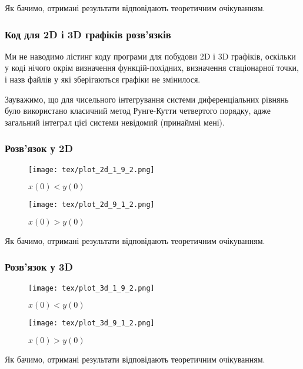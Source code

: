 Як бачимо, отримані результати відповідають теоретичним очікуванням.

\subsubsection{Код для 2D і 3D графіків розв'язків}

Ми не наводимо лістинг коду програми для побудови 2D і 3D графіків, оскільки у коді нічого окрім визначення функцій-похідних, визначення стаціонарної точки, і назв файлів у які зберігаються графіки не змінилося. \medskip

Зауважимо, що для чисельного інтегрування системи диференціальних рівнянь було використано класичний метод Рунге-Кутти четвертого порядку, адже загальний інтеграл цієї системи невідомий (принаймні мені). 

\subsubsection{Розв'язок у 2D}

\begin{figure}[H]
	\centering
	\caption{$x(0) < y(0)$}
	\texttt{[image: tex/plot\_2d\_1\_9\_2.png]}
\end{figure}

\begin{figure}[H]
	\centering
	\caption{$x(0) > y(0)$}
	\texttt{[image: tex/plot\_2d\_9\_1\_2.png]}
\end{figure}

Як бачимо, отримані результати відповідають теоретичним очікуванням.

\newpage
	
\subsubsection{Розв'язок у 3D}

\begin{minipage}[t]{.5\textwidth}
\begin{figure}[H]
	\centering
	\caption{$x(0) < y(0)$}
	\texttt{[image: tex/plot\_3d\_1\_9\_2.png]}
\end{figure}
\end{minipage}
\begin{minipage}[t]{.5\textwidth}
\begin{figure}[H]
	\centering
	\caption{$x(0) > y(0)$}
	\texttt{[image: tex/plot\_3d\_9\_1\_2.png]}
\end{figure}
\end{minipage}

Як бачимо, отримані результати відповідають теоретичним очікуванням.

